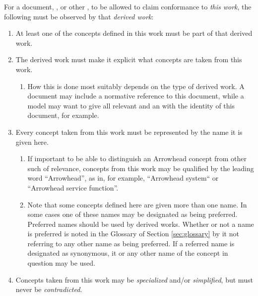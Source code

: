 %
%

For a document, , or other , to be allowed to claim conformance to \textit{this work}, the following must be observed by that \textit{derived work}:

\begin{enumerate}
\item At least one of the concepts defined in this work must be part of that derived work.
\item The derived work must make it explicit what concepts are taken from this work.
	\begin{enumerate}
	\item How this is done most suitably depends on the type of derived work. A document may include a normative reference to this document, while a model may want to give all relevant  and  an  with the identity of this document, for example.
	\end{enumerate}
\item Every concept taken from this work must be represented by the name it is given here.
	\begin{enumerate}
	\item If important to be able to distinguish an Arrowhead concept from other such of relevance, concepts from this work may be qualified by the leading word ``Arrowhead'', as in, for example, ``Arrowhead system`` or ``Arrowhead service function''.
	\item Note that some concepts defined here are given more than one name. In some cases one of these names may be designated as being preferred. Preferred names should be used by derived works. Whether or not a name is preferred is noted in the Glossary of Section \ref{sec:glossary} by it not referring to any other name as being preferred. If a referred name is designated as synonymous, it or any other name of the concept in question may be used.
	\end{enumerate}
\item Concepts taken from this work may be \textit{specialized} and/or \textit{simplified}, but must never be \textit{contradicted}.
	\begin{enumerate}

\end{enumerate}
\end{enumerate}
